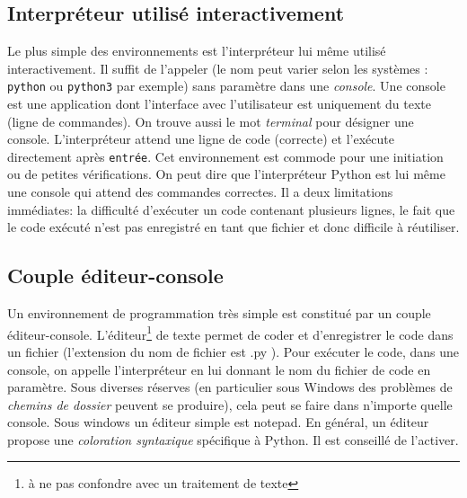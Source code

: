 \subsection{Interpréteur utilisé interactivement}
Le plus simple des environnements est l'interpréteur lui même utilisé interactivement. Il suffit de l'appeler (le nom peut varier selon les systèmes : \texttt{python} ou \texttt{python3} par exemple) sans paramètre dans une \emph{console}. Une console est une application dont l'interface avec l'utilisateur est uniquement du texte (ligne de commandes). On trouve aussi le mot \emph{terminal} pour désigner une console.\newline
L'interpréteur attend une ligne de code (correcte) et l'exécute directement après \texttt{entrée}. Cet environnement est commode pour une initiation ou de petites vérifications. 
On peut dire que l'interpréteur Python est lui même une console qui attend des commandes correctes.
Il a deux limitations immédiates: la difficulté d'exécuter un code contenant plusieurs lignes, le fait que le code exécuté n'est pas enregistré en tant que fichier et donc difficile à réutiliser.

\subsection{Couple éditeur-console}
Un environnement de programmation très simple est constitué par un couple éditeur-console.\newline
L'éditeur\footnote{à ne pas confondre avec un traitement de texte} de texte   permet de coder et d'enregistrer le code dans un fichier (l'extension du nom de fichier est .py ).\newline
Pour exécuter le code, dans une console, on appelle l'interpréteur en lui donnant le nom du fichier de code en paramètre.\newline
Sous diverses réserves (en particulier sous Windows des problèmes de \emph{chemins de dossier} peuvent se produire), cela peut se faire dans n'importe quelle console. Sous windows un éditeur simple est notepad. En général, un éditeur propose une \emph{coloration syntaxique}  spécifique à Python. Il est conseillé de l'activer.

